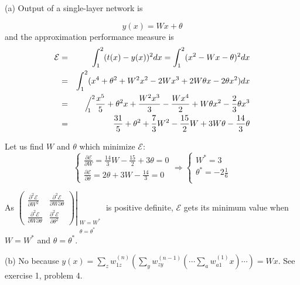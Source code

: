 \begin{enumerate}
  \begin{solution}

    (a) Output of a single-layer network is

    \begin{equation*}
      y(x)=Wx+\theta
    \end{equation*}
    and the approximation performance measure is
    \begin{eqnarray*}
      \mathcal{E}&=&\int_1^2(t(x)-y(x))^2 dx = \int_1^2
      (x^2-Wx-\theta)^2dx\\
      &=&\int_1^2 (x^4+\theta^2 +W^2x^2-2Wx^3+2W\theta x-2\theta x^2)dx\\
      &=&\Big/^2_{\mspace{-11.0mu} 1} \frac{x^5}{5}
      +\theta^2x+\frac{W^2x^3}{3}-\frac{Wx^4}{2}+W\theta x^2-\frac{2}{3}\theta x^3\\
      &=&\frac{31}{5}+\theta^2 +\frac{7}{3}W^2-\frac{15}{2}W+3W\theta-\frac{14}{3}\theta
    \end{eqnarray*}

    Let us find $W$ and $\theta$ which minimize $\mathcal{E}$:
    \begin{equation*}
      \left\{\begin{array}{l}
          \frac{\partial\mathcal{E}}{\partial
            W}=\frac{14}{3}W-\frac{15}{2}+3\theta = 0\\
          \frac{\partial\mathcal{E}}{\partial
            \theta}=2\theta+3W -\frac{14}{3} = 0
        \end{array}\right.
      \Rightarrow
      \left\{\begin{array}{l}
          W^*=3\\
          \theta^*=-2\frac{1}{6}\\
        \end{array}\right.
    \end{equation*}

    As $\left.\begin{pmatrix} \frac{\partial^2\mathcal{E}}{\partial W^2} &
        \frac{\partial^2\mathcal{E}}{\partial W \partial\theta}\\
        \frac{\partial^2\mathcal{E}}{\partial W \partial\theta} &
        \frac{\partial^2\mathcal{E}}{\partial\theta^2}
      \end{pmatrix}\right|_{\begin{array}{l}\scriptstyle  W=W^*\\\theta=\theta^*\end{array}}$
    is positive definite, $\mathcal{E}$ gets its minimum value when
    $W=W^*$ and $\theta=\theta^*$.

    \vspace{0.5cm}
    (b) No because $y(x)=\sum_z w_{1z}^{(n)}\left(\sum_y
      w_{zy}^{(n-1)}\left(\dotsm \sum_a w_{a1}^{(1)}x\right)\dotsm\right) = Wx$. See
    exercise 1, problem 4.

  \end{solution}



\end{enumerate}
